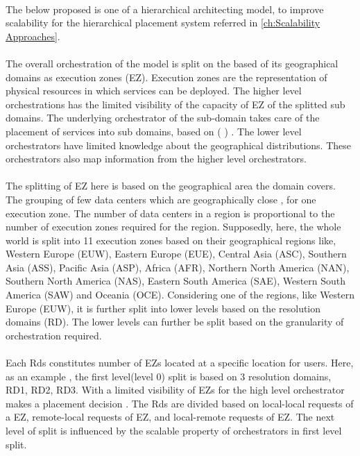 \paragraph{} The below proposed is one of a hierarchical architecting model, to improve scalability for the hierarchical placement system referred in \ref{ch:Scalability Approaches}. 

\paragraph{}The overall orchestration of the model is split on the based of its geographical domains as execution zones (EZ). Execution zones are the representation of physical resources in which services can be deployed. The higher level orchestrations has the limited visibility of the capacity of EZ of the splitted sub domains. The underlying orchestrator of the sub-domain takes care of the placement of services into sub domains, based on (       ) . The lower level orchestrators have limited knowledge about the geographical distributions. These orchestrators also map information from the higher level orchestrators\cite{maini2016hierarchical}.

\paragraph{}The splitting of EZ here is based on the geographical area the domain covers. The grouping of few data centers which are geographically close , for one execution zone. The number of data centers in a region is proportional to the number of execution zones required for the region. Supposedly, here, the whole world is split into 11 execution zones based on their geographical regions like, Western Europe (EUW), Eastern Europe (EUE), Central Asia (ASC), Southern Asia (ASS), Pacific Asia (ASP), Africa (AFR), Northern North America (NAN), Southern North America (NAS), Eastern South America (SAE), Western South America (SAW) and Oceania (OCE). Considering one of the regions, like Western Europe (EUW), it is further split into lower levels based on the resolution domains (RD). The lower levels can further be split based on the granularity of orchestration required\cite{maini2016hierarchical}.

\paragraph{}Each Rds constitutes number of EZs located at a specific location for users. Here, as an example , the first level(level 0)  split is based on 3 resolution domains, RD1, RD2, RD3. With a limited visibility of EZs for the high level orchestrator makes a placement decision . The Rds are divided based on local-local requests of a EZ, remote-local requests of EZ, and local-remote requests of EZ. The next level of split is influenced by the scalable property of orchestrators in first level split\cite{maini2016hierarchical}.